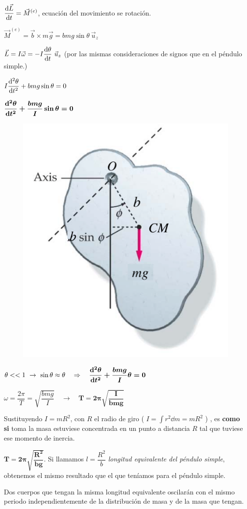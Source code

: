 {\begin{multicols}{2}
$\displaystyle \dv{\vec L}{t}=\vec M^{(e)}$, ecuación del movimiento se rotación.	

$\vec M^{(e)}=\vec b \times m\vec g=bmg\sin\theta \ \vec u_z$

$\vec L=I\vec \omega= -I \displaystyle \dv{\theta}{t} \ \vec u_z$ \textcolor{gris}{(por las mismas consideraciones de signos que en el péndulo simple.)}

$\displaystyle I \dv[2]{\theta}{t} + bmg\sin \theta=0$

$\boldsymbol{ \displaystyle \dv[2]{\theta}{t}+\dfrac{bmg}{I} \sin \theta =0 }$
\begin{figure}[H]
		\centering
		\includegraphics[width=.5\textwidth]{imagenes/imagenes19/T19IM07.png}
	\end{figure}	
\end{multicols}

$\theta << 1 \ \to \ \sin \theta \approx \theta \quad \Rightarrow \quad \boldsymbol{ \displaystyle \dv[2]{\theta}{t}+\dfrac{bmg}{I}  \theta =0 }$

$\omega=\dfrac{2\pi}{T}=\sqrt{\dfrac{bmg}{I}} \quad \to \quad \boldsymbol{ T=2\pi \sqrt{\dfrac{I}{bmg}}}$

Sustituyendo $I=mR^2$, con $R$ el radio de giro \textcolor{gris}{ ( $I=\int r^2 \dd m = m R^2$ ) }, es \textbf{como si} toma la masa estuviese concentrada en un punto a distancia $R$ tal que tuviese ese momento de inercia.

$ \boldsymbol{ T=2\pi \sqrt{ \dfrac{R^2}{bg} } }$. Si llamamos $l=\dfrac{R^2}{b}$ \emph{longitud equivalente del péndulo simple}, obtenemos el mismo resultado que el que teníamos para el péndulo simple.

Dos cuerpos que tengan la misma longitud equivalente oscilarán con el mismo periodo independientemente de la distribución de masa y de la masa que tengan.

}

